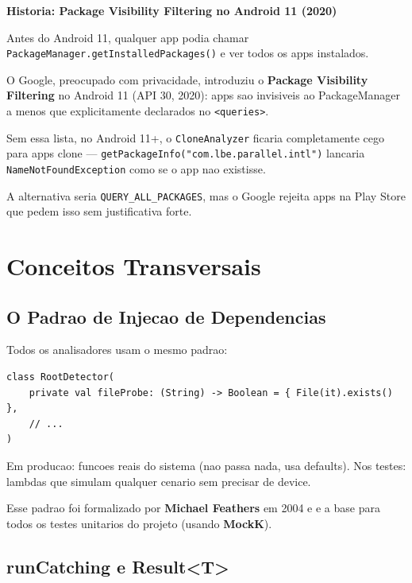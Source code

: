 \documentclass[12pt,a4paper]{article}
\begin{document}
\begin{historybox}
\textbf{Historia: Package Visibility Filtering no Android 11 (2020)}

Antes do Android 11, qualquer app podia chamar
\texttt{PackageManager.getInstalledPackages()} e ver todos os apps instalados.

O Google, preocupado com privacidade, introduziu o \textbf{Package Visibility
Filtering} no Android 11 (API 30, 2020): apps sao invisiveis ao PackageManager
a menos que explicitamente declarados no \texttt{<queries>}.

Sem essa lista, no Android 11+, o \texttt{CloneAnalyzer} ficaria completamente
cego para apps clone --- \texttt{getPackageInfo("com.lbe.parallel.intl")}
lancaria \texttt{NameNotFoundException} como se o app nao existisse.

A alternativa seria \texttt{QUERY\_ALL\_PACKAGES}, mas o Google rejeita
apps na Play Store que pedem isso sem justificativa forte.
\end{historybox}

\newpage

\section{Conceitos Transversais}

\subsection{O Padrao de Injecao de Dependencias}

Todos os analisadores usam o mesmo padrao:

\begin{lstlisting}
class RootDetector(
    private val fileProbe: (String) -> Boolean = { File(it).exists() },
    // ...
)
\end{lstlisting}

Em producao: funcoes reais do sistema (nao passa nada, usa defaults).
Nos testes: lambdas que simulam qualquer cenario sem precisar de device.

Esse padrao foi formalizado por \textbf{Michael Feathers} em 2004 e e a base
para todos os testes unitarios do projeto (usando \textbf{MockK}).

\subsection{runCatching e Result<T>}
\end{document}
